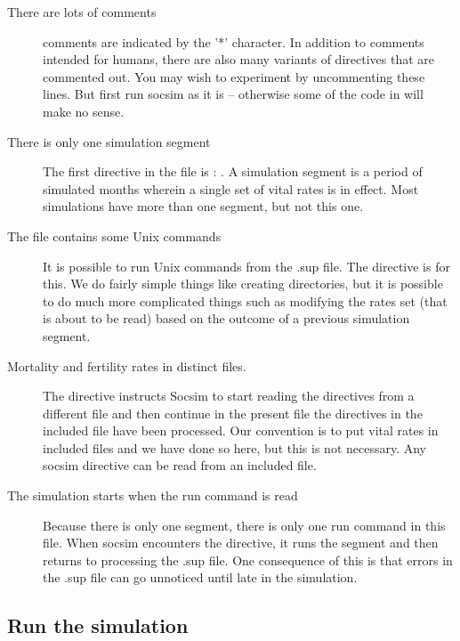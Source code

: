 \begin{description}

\item [There are lots of comments] comments are indicated by the '*'
  character.  In addition to comments intended for humans, there are
  also many variants of directives that are commented out.  You may
  wish to experiment by uncommenting these lines.  But first run
  socsim as it is -- otherwise some of the code in 
  will make no sense.

\item[There is only one simulation segment] The first directive in the
  file is : . A simulation segment is a period of
  simulated months wherein a single set of vital rates is in
  effect. Most simulations have more than one segment, but not this
  one.


\item[The file contains some Unix commands] It is possible to run Unix
  commands from the .sup file. The  directive is for
  this. We do fairly simple things like creating directories, but it
  is possible to do much more complicated things such as modifying the
  rates set (that is about to be read) based on the outcome of a
  previous simulation segment.

\item[Mortality and fertility rates in distinct files.] The
   directive instructs Socsim to start reading the
  directives from a different file and then continue in the present
  file the directives in the included file have been processed.  Our
  convention is to put vital rates in included files and we have done
  so here, but this is not necessary. Any socsim directive can be read
  from an included file.

\item[The simulation starts when the run command is read] Because
  there is only one segment, there is only one run command in this
  file. When socsim encounters the  directive, it runs the
  segment and then returns to processing the .sup file. One
  consequence of this is that errors in the .sup file can go unnoticed
  until late in the simulation.

\end{description}

\subsection{Run the simulation}


